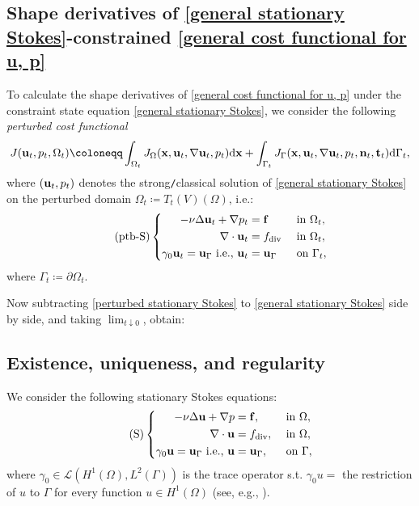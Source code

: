 \documentclass[oneside,11pt]{book}
\numberwithin{equation}{section}
\begin{document}
\subsection{Shape derivatives of \eqref{general stationary Stokes}-constrained \eqref{general cost functional for u, p}}
To calculate the shape derivatives of \eqref{general cost functional for u, p} under the constraint state equation \eqref{general stationary Stokes}, we consider the following \textit{perturbed cost functional}
\begin{align}
    \label{perturbed cost functional for stationary Stokes}
    J({\bf u}_t,p_t,\Omega_t)\coloneqq\int_{\Omega_t} J_\Omega({\bf x},{\bf u}_t,\nabla{\bf u}_t,p_t){\rm d}{\bf x} + \int_{\Gamma_t} J_\Gamma({\bf x},{\bf u}_t,\nabla{\bf u}_t,p_t,{\bf n}_t,{\bf t}_t){\rm d}\Gamma_t,
\end{align}
where $({\bf u}_t,p_t)$ denotes the strong\texttt{/}classical solution of \eqref{general stationary Stokes} on the perturbed domain $\Omega_t\coloneqq T_t(V)(\Omega)$, i.e.:
\begin{equation}
    \label{perturbed stationary Stokes}
    \tag{ptb-S}
    \left\{\begin{split}
        -\nu\Delta{\bf u}_t + \nabla p_t &= {\bf f} &&\mbox{ in } \Omega_t,\\
        \nabla\cdot{\bf u}_t &= f_{\rm div} &&\mbox{ in } \Omega_t,\\
        \gamma_0{\bf u}_t = {\bf u}_\Gamma \mbox{ i.e., } {\bf u}_t &= {\bf u}_\Gamma &&\mbox{ on } \Gamma_t,
    \end{split}\right.
\end{equation}
where $\Gamma_t\coloneqq\partial\Omega_t$.

Now subtracting \eqref{perturbed stationary Stokes} to \eqref{general stationary Stokes} side by side, and taking $\lim_{t\downarrow 0}$, obtain:

\subsection{Existence, uniqueness, and regularity}
We consider the following stationary Stokes equations:
\begin{equation}
    \label{stationary Stokes: Dirichlet BC}
    \tag{S}
    \left\{\begin{split}
        -\nu\Delta{\bf u} + \nabla p &= {\bf f},&&\mbox{ in } \Omega,\\
        \nabla\cdot{\bf u} &= f_{\rm div},&&\mbox{ in } \Omega,\\
        \gamma_0{\bf u} = {\bf u}_\Gamma \mbox{ i.e., } {\bf u} &= {\bf u}_\Gamma,&&\mbox{ on } \Gamma,
    \end{split}\right.
\end{equation}
where $\gamma_0\in\mathcal{L}(H^1(\Omega),L^2(\Gamma))$ is the trace operator s.t. $\gamma_0u =$ the restriction of $u$ to $\Gamma$ for every function $u\in H^1(\Omega)$ (see, e.g., \cite[p. 6]{Temam2000}).
\end{document}
